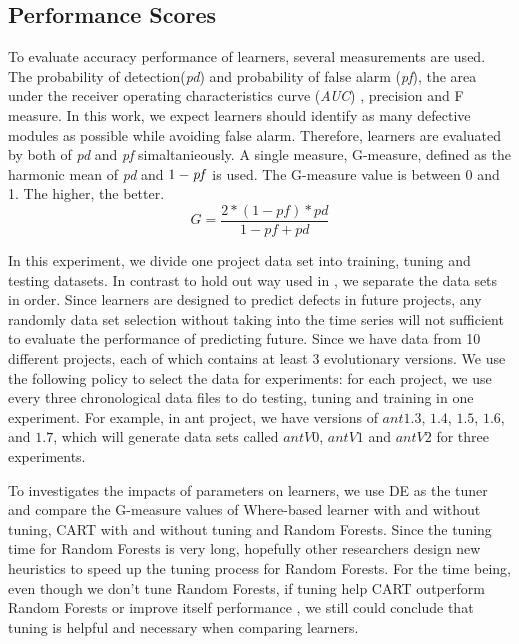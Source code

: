 \documentclass{sig-alternative}
\begin{document}
\subsection{Performance Scores}


To evaluate accuracy performance of learners, several measurements are used.
The 
probability of  detection({\it pd}) and probability of false alarm ({\it pf})\cite{menzies2007data}, 
the area under the receiver operating characteristics curve ({\it AUC})
\cite{lessmann2008benchmarking}, precision and F measure\cite{zhang2007comments}. In this work, we 
expect learners should identify as many defective modules as possible while avoiding false 
alarm. Therefore, learners are evaluated by both of {\it pd} and {\it pf} simaltanieously. A single 
measure, G-measure, defined as the harmonic mean of {\it pd} and $1-{\it pf}$  is used. The 
G-measure value is between 0 and 1. The higher, the better.
\begin{equation}
G = \frac{2*(1-pf)*pd}{1-pf+pd}
\end{equation}

In this experiment, we divide one project data set into training, tuning 
and testing datasets. In contrast to hold out way used in \cite{lessmann2008benchmarking, 
menzies2007data}, we separate the data sets in order. Since learners are designed to predict 
defects in future projects,  any randomly data set selection without taking into the time series 
will not sufficient to evaluate the performance of predicting future. Since we have data from 
10 different projects, each of which contains at least 3 evolutionary versions. We use the following policy 
to select the data for experiments: for each project, we use every three chronological data files 
to do testing, tuning and training in one experiment. For example, in ant project,
we have versions of $ant1.3$, $1.4$, $1.5$, $1.6$, and $1.7$, which will generate data sets called
 $antV0$, $antV1$ and $antV2$ for three experiments.

To investigates the impacts of parameters on learners, we use DE as the tuner and compare the G-measure 
values of Where-based learner with and without tuning, CART with and without tuning and Random 
Forests. Since the tuning time for Random Forests is very long, hopefully other researchers design
new heuristics to speed up the tuning process for Random Forests.  For the time being, even though
we don't tune Random Forests, if tuning help CART outperform Random Forests or improve itself performance ,
we still could conclude that tuning is helpful and necessary when comparing learners.
\end{document}
